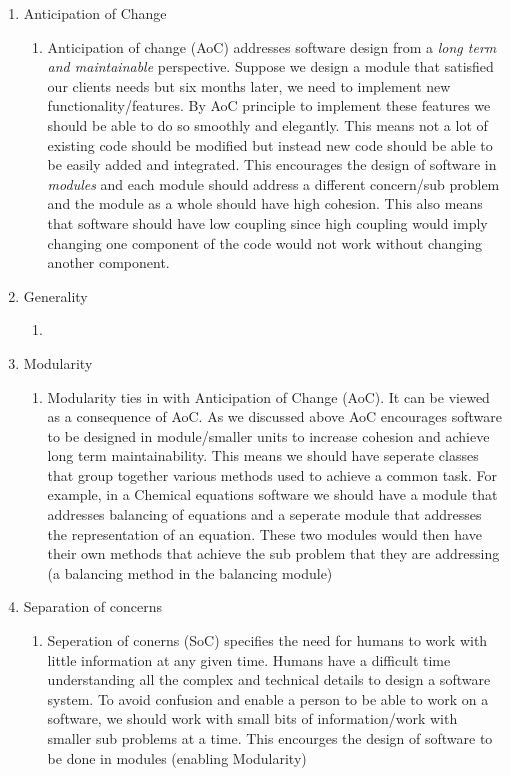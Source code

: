 \documentclass[12pt]{article}
\begin{document}
\begin{enumerate}[a)]
\begin{enumerate}
		\item Anticipation of Change
			\begin{enumerate}
					\item Anticipation of change (AoC) addresses software design from a \emph{long term and maintainable} perspective. Suppose we design a module that satisfied our clients needs but six months later, we need to implement new functionality/features. By AoC principle to implement these features we should be able to do so smoothly and elegantly. This means not a lot of existing code should be modified but instead new code should be able to be easily added and integrated. This encourages the design of software in \emph{modules} and each module should address a different concern/sub problem and the module as a whole should have high cohesion. This also means that software should have low coupling since high coupling would imply changing one component of the code would not work without changing another component.
			\end{enumerate}
		
		\item Generality
			\begin{enumerate}
			
			\item
					
			\end{enumerate}
			
		\item Modularity
			\begin{enumerate}
					\item Modularity ties in with Anticipation of Change (AoC). It can be viewed as a consequence of AoC. As we discussed above AoC encourages software to be designed in module/smaller units to increase cohesion and achieve long term maintainability. This means we should have seperate classes that group together various methods used to achieve a common task. For example, in a Chemical equations software we should have a module that addresses balancing of equations and a seperate module that addresses the representation of an equation. These two modules would then have their own methods that achieve the sub problem that they are addressing (a balancing method in the balancing module)
			\end{enumerate}
			
		\item Separation of concerns
			\begin{enumerate}
					\item Seperation of conerns (SoC) specifies the need for humans to work with little information at any given time. Humans have a  difficult time understanding all the complex and technical details to design a software system. To avoid confusion and enable a person to be able to work on a software, we should work with small bits of information/work with smaller sub problems at a time. This encourges the design of software to be done in modules (enabling Modularity)
			\end{enumerate}
	\end{enumerate}
  
\end{enumerate}
\end{document}
